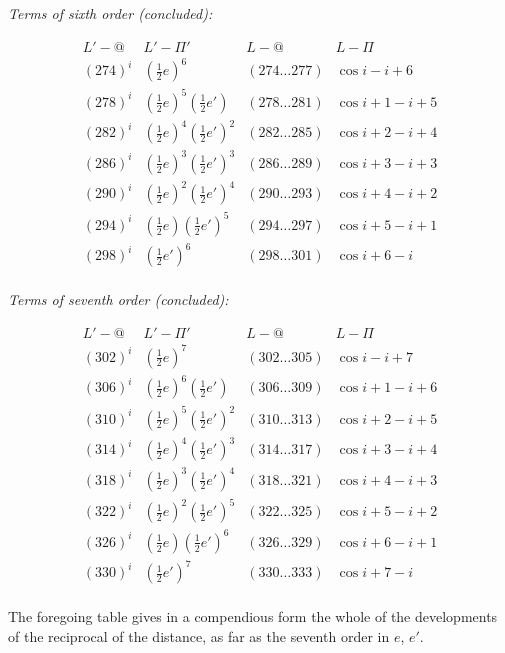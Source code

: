 \documentclass[11pt,a4paper]{article}
\theoremstyle{plain}
\theoremstyle{definition}
\theoremstyle{remark}
\begin{document}
\textit{Terms of sixth order (concluded):}

\[
\begin{array}{cccc}
L'-@ & L'-\Pi' & L-@ & L-\Pi \\
(274)^{i} & (\tfrac12 e)^{6} & (274\dots277) & \cos i-i+6 \\
(278)^{i} & (\tfrac12 e)^{5}(\tfrac12 e') & (278\dots281) & \cos i+1-i+5 \\
(282)^{i} & (\tfrac12 e)^{4}(\tfrac12 e')^{2} & (282\dots285) & \cos i+2-i+4 \\
(286)^{i} & (\tfrac12 e)^{3}(\tfrac12 e')^{3} & (286\dots289) & \cos i+3-i+3 \\
(290)^{i} & (\tfrac12 e)^{2}(\tfrac12 e')^{4} & (290\dots293) & \cos i+4-i+2 \\
(294)^{i} & (\tfrac12 e)(\tfrac12 e')^{5} & (294\dots297) & \cos i+5-i+1 \\
(298)^{i} & (\tfrac12 e')^{6} & (298\dots301) & \cos i+6-i \\
\end{array}
\]

\textit{Terms of seventh order (concluded):}

\[
\begin{array}{cccc}
L'-@ & L'-\Pi' & L-@ & L-\Pi \\
(302)^{i} & (\tfrac12 e)^{7} & (302\dots305) & \cos i-i+7 \\
(306)^{i} & (\tfrac12 e)^{6}(\tfrac12 e') & (306\dots309) & \cos i+1-i+6 \\
(310)^{i} & (\tfrac12 e)^{5}(\tfrac12 e')^{2} & (310\dots313) & \cos i+2-i+5 \\
(314)^{i} & (\tfrac12 e)^{4}(\tfrac12 e')^{3} & (314\dots317) & \cos i+3-i+4 \\
(318)^{i} & (\tfrac12 e)^{3}(\tfrac12 e')^{4} & (318\dots321) & \cos i+4-i+3 \\
(322)^{i} & (\tfrac12 e)^{2}(\tfrac12 e')^{5} & (322\dots325) & \cos i+5-i+2 \\
(326)^{i} & (\tfrac12 e)(\tfrac12 e')^{6} & (326\dots329) & \cos i+6-i+1 \\
(330)^{i} & (\tfrac12 e')^{7} & (330\dots333) & \cos i+7-i \\
\end{array}
\]

The foregoing table gives in a compendious form the whole of the developments of the reciprocal of the distance, as far as the seventh order in $e$, $e'$.

\vspace{2em}
\end{document}
